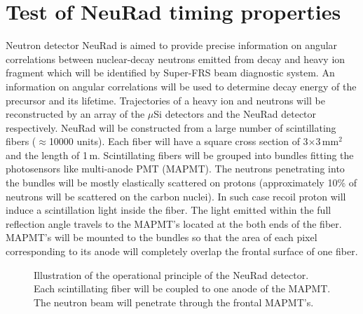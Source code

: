 \documentclass{webofc}
\begin{document}
\section{Test of NeuRad timing properties}
Neutron detector NeuRad is aimed to provide precise information on angular correlations between nuclear-decay neutrons emitted from decay and heavy ion fragment which will be identified by Super-FRS beam diagnostic system. An information on angular correlations will be used to determine decay energy of the precursor and its lifetime. Trajectories of a heavy ion and neutrons will be reconstructed by an array of the $\mu$Si detectors and the NeuRad detector respectively. %
NeuRad will be constructed from a large number of scintillating fibers ($\approx$10000 units). Each fiber will have a square cross section of 3$\times$3\,mm$^2$ and the length of 1\,m.%
Scintillating fibers will be grouped into bundles fitting the photosensors like multi-anode PMT (MAPMT).
The neutrons penetrating into the bundles will be mostly elastically scattered on protons (approximately 10\% of neutrons will be scattered on the carbon nuclei). In such case recoil proton will induce a scintillation light inside the fiber. 
The light emitted within the full reflection angle travels to the MAPMT's located at the both ends of the fiber.
MAPMT's will be mounted to the bundles so that the area of each pixel corresponding to its anode will completely overlap the frontal surface of one fiber.

\begin{figure}[h]
	\caption{Illustration of the operational principle of the NeuRad detector. Each scintillating fiber will be coupled to one anode of the MAPMT. The neutron beam will penetrate through the frontal MAPMT's.}
	\label{ris:neuradPrinciple}
\end{figure}
\end{document}
